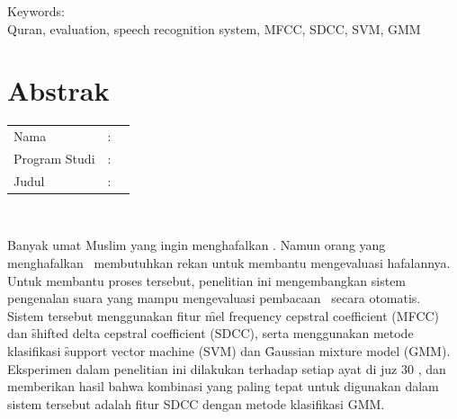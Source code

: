 
\vspace*{0.2cm}

\noindent Keywords: \\ 
\noindent Quran, evaluation, speech recognition system, MFCC, SDCC, SVM, GMM \\

\newpage%
%
%
%

\chapter*{Abstrak}

\vspace*{0.2cm}

\noindent \begin{tabular}{l l p{10cm}}
	Nama&: & \penulis \\
	Program Studi&: & \program \\
	Judul&: & \judul \\
\end{tabular} \\ 

\vspace*{0.5cm}

\noindent
Banyak umat Muslim yang ingin menghafalkan \quran. Namun orang yang menghafalkan \quran~membutuhkan rekan untuk membantu mengevaluasi hafalannya. Untuk membantu proses tersebut, penelitian ini mengembangkan sistem pengenalan suara yang mampu mengevaluasi pembacaan \quran~secara otomatis. Sistem tersebut menggunakan fitur \f{mel frequency cepstral coefficient} (MFCC) dan \f{shifted delta cepstral coefficient} (SDCC), serta menggunakan metode klasifikasi \f{support vector machine} (SVM) dan \f{Gaussian mixture model} (GMM). Eksperimen dalam penelitian ini dilakukan terhadap setiap ayat di juz 30 \quran, dan memberikan hasil bahwa kombinasi yang paling tepat untuk digunakan dalam sistem tersebut adalah fitur SDCC dengan metode klasifikasi GMM. \\

